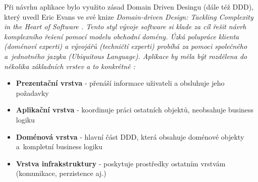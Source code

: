 Při návrhu aplikace bylo využito zásad Domain Driven Desingu (dále též DDD), který uvedl Eric Evans ve své knize \it{Domain-driven Design: Tackling Complexity in the Heart of Software} \cite{EvansDDD}. Tento styl vývoje software si klade za cíl řešit návrh komplexního řešení pomocí modelu obchodní domény. Úzká polupráce klienta (doménoví experti) a vývojářů (techničtí experti) probíhá za pomoci společného a~jednotného jazyka (\it{Ubiquitous Language}). Aplikace by měla být rozdělena do několika základních vrstev a to konkrétně \cite{EvansDDD}:

\begin{itemize}
	\item \textbf{Prezentační vrstva} - přenáší informace uživateli a obsluhuje jeho požadavky
	\item \textbf{Aplikační vrstva} - koordinuje práci ostatních objektů, neobsahuje business logiku
	\item \textbf{Doménová vrstva} - hlavní část DDD, která obsahuje doménové objekty a~kompletní business logiku
	\item \textbf{Vrstva infrakstruktury} - poskytuje prostředky ostatním vrstvám (komunikace, perzistence aj.)
\end{itemize}

